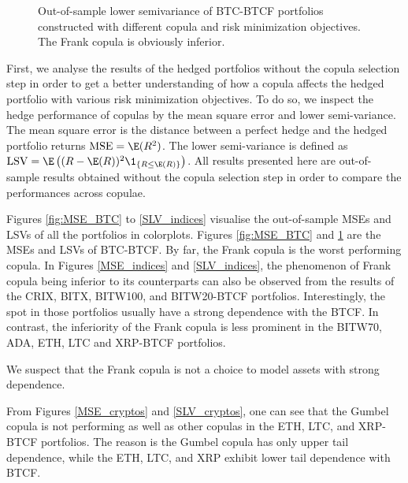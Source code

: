 \begin{figure}[t]
\begin{minipage}[t]{.475\textwidth}
      \caption{Out-of-sample lower semivariance of BTC-BTCF portfolios constructed with different copula and risk minimization objectives.
      The Frank copula is obviously inferior.}
    \label{fig:SLV_BTC}
    \end{minipage}
    \end{figure}  

First, we analyse the results of the hedged portfolios without the
copula selection step in order to get a better understanding of how a
copula affects the hedged portfolio with various risk minimization
objectives.
To do so, we inspect the hedge performance of copulas by
the mean square error and lower semi-variance.
The mean square error
is the distance between a perfect hedge and the hedged portfolio
returns $\operatorname{MSE}= \E(R^2)$.
The lower semi-variance is defined as
$\operatorname{LSV}=\E \left( (R-\E(R))^2 \1_{\{R\leq \E(R)\}} \right)$.
All results presented here are out-of-sample results obtained without
the copula selection step in order to compare the performances across
copulae.

Figures \ref{fig:MSE_BTC} to \ref{SLV_indices} visualise the out-of-sample MSEs and LSVs of all the portfolios in colorplots.
Figures \ref{fig:MSE_BTC} and \ref{fig:SLV_BTC} are the MSEs and LSVs of BTC-BTCF. 
By far, the Frank copula is the worst performing copula.
In Figures \ref{MSE_indices} and \ref{SLV_indices}, the phenomenon
of Frank copula being inferior to its counterparts can also be observed
from the results of the CRIX, BITX, BITW100, and BITW20-BTCF
portfolios.
Interestingly, the spot in those portfolios usually have a strong
dependence with the BTCF.
In contrast, the inferiority of the Frank copula is less prominent in
the BITW70, ADA, ETH, LTC and XRP-BTCF portfolios.

We suspect that the Frank copula is not a choice to model assets with
strong dependence.

From Figures \ref{MSE_cryptos} and
\ref{SLV_cryptos}, one can see that the Gumbel copula is not performing as well as
other copulas in the ETH, LTC, and XRP-BTCF portfolios.
The reason is the Gumbel copula has only upper tail dependence,
while the ETH, LTC, and XRP exhibit lower tail dependence with BTCF.

